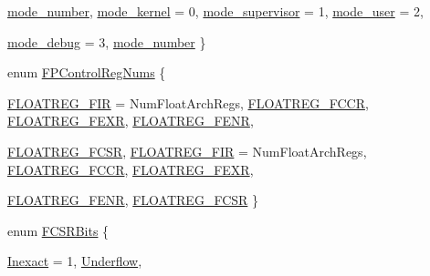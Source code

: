 \begin{DoxyCompactItemize}
\par
\hyperlink{namespaceMipsISA_a19269c193c0c4866cdc4e5abd433f9fcaf97df9db0535ca522f7b8d2a6fa203f4}{mode\_\-number}, 
\hyperlink{namespaceMipsISA_a19269c193c0c4866cdc4e5abd433f9fcaf9ca40d36bda60aea728f69a10a455a1}{mode\_\-kernel} =  0, 
\hyperlink{namespaceMipsISA_a19269c193c0c4866cdc4e5abd433f9fcab3d3f3b4766251166f2c8057fa484f19}{mode\_\-supervisor} =  1, 
\hyperlink{namespaceMipsISA_a19269c193c0c4866cdc4e5abd433f9fca7f68981a5aa91b746361d036f7e44f50}{mode\_\-user} =  2, 
\par
\hyperlink{namespaceMipsISA_a19269c193c0c4866cdc4e5abd433f9fca8dadb017a33541c825091bafb0339e4c}{mode\_\-debug} =  3, 
\hyperlink{namespaceMipsISA_a19269c193c0c4866cdc4e5abd433f9fcaf97df9db0535ca522f7b8d2a6fa203f4}{mode\_\-number}
 \}
\item 
enum \hyperlink{namespaceMipsISA_a5c25eb02ee099af970c3b8d2e4f5dc43}{FPControlRegNums} \{ \par
\hyperlink{namespaceMipsISA_a5c25eb02ee099af970c3b8d2e4f5dc43a3b749b1d9b33241fa39082cd47a5401e}{FLOATREG\_\-FIR} =  NumFloatArchRegs, 
\hyperlink{namespaceMipsISA_a5c25eb02ee099af970c3b8d2e4f5dc43a41a9157321aeb48a256911179ea15bd1}{FLOATREG\_\-FCCR}, 
\hyperlink{namespaceMipsISA_a5c25eb02ee099af970c3b8d2e4f5dc43a333c1e7b14ba5577023b0ab300c443ae}{FLOATREG\_\-FEXR}, 
\hyperlink{namespaceMipsISA_a5c25eb02ee099af970c3b8d2e4f5dc43a63e4bfba7a5762656f4d1690d816175d}{FLOATREG\_\-FENR}, 
\par
\hyperlink{namespaceMipsISA_a5c25eb02ee099af970c3b8d2e4f5dc43afb4cd967061a283e84d18cfc4e8a5a7b}{FLOATREG\_\-FCSR}, 
\hyperlink{namespaceMipsISA_a5c25eb02ee099af970c3b8d2e4f5dc43a3b749b1d9b33241fa39082cd47a5401e}{FLOATREG\_\-FIR} =  NumFloatArchRegs, 
\hyperlink{namespaceMipsISA_a5c25eb02ee099af970c3b8d2e4f5dc43a41a9157321aeb48a256911179ea15bd1}{FLOATREG\_\-FCCR}, 
\hyperlink{namespaceMipsISA_a5c25eb02ee099af970c3b8d2e4f5dc43a333c1e7b14ba5577023b0ab300c443ae}{FLOATREG\_\-FEXR}, 
\par
\hyperlink{namespaceMipsISA_a5c25eb02ee099af970c3b8d2e4f5dc43a63e4bfba7a5762656f4d1690d816175d}{FLOATREG\_\-FENR}, 
\hyperlink{namespaceMipsISA_a5c25eb02ee099af970c3b8d2e4f5dc43afb4cd967061a283e84d18cfc4e8a5a7b}{FLOATREG\_\-FCSR}
 \}
\item 
enum \hyperlink{namespaceMipsISA_a79915055f9ee1b5f815a7998dbc159f7}{FCSRBits} \{ \par
\hyperlink{namespaceMipsISA_a79915055f9ee1b5f815a7998dbc159f7a7a184d7d7f7ed872956f05a5624e76f1}{Inexact} =  1, 
\hyperlink{namespaceMipsISA_a79915055f9ee1b5f815a7998dbc159f7a32718a880dad0629f0eacfc00c357a80}{Underflow}, 

\end{DoxyCompactItemize}
